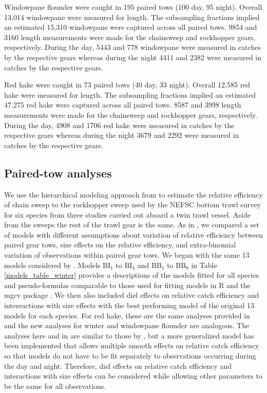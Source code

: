 \documentclass[12pt,letterpaper, leqno]{article}
\begin{document}
Windowpane flounder were caught in 195 paired tows (100 day, 95 night). Overall 13,014 windowpane were measured for length. The subsampling fractions implied an estimated 15,310 windowpane were captured across all paired tows. 9854 and 3160 length measurements were made for the chainsweep and rockhopper gears, respectively.  During the day, 5443 and 778 windowpane were measured in catches by the respective gears whereas during the night 4411 and 2382 were measured in catches by the respective gears.

Red hake were caught in 73 paired tows (40 day, 33 night). Overall 12,585  red hake were measured for length. The subsampling fractions implied an estimated 47,275 red hake were captured across all paired tows. 8587 and 3998 length measurements were made for the chainsweep and rockhopper gears, respectively.  During the day, 4908 and 1706 red hake were measured in catches by the respective gears whereas during the night 3679 and 2292 were measured in catches by the respective gears.

\subsection*{Paired-tow analyses}

We use the hierarchical modeling approach from \citet{miller13} to estimate the relative efficiency of chain sweep to the rockhopper sweep used by the NEFSC bottom trawl survey for six species from three studies carried out aboard a twin trawl vessel. Aside from the sweeps the rest of the trawl gear is the same.  As in \citet{miller13}, we compared a set of models with different assumptions about variation of relative efficiency between paired gear tows, size effects on the relative efficiency, and extra-binomial variation of observations within paired gear tows. We began with the same 13 models considered by \citet{miller13}. Models BI$_1$ to BI$_4$ and BB$_1$ to BB$_8$ in Table \ref{models_table_winter} provides a descriptions of the models fitted for all species and pseudo-formulas comparable to those used for fitting models in R and the mgcv package \citep{R19,wood06}. We then also included diel effects on relative catch efficiency and intereactions with size effects with the best performing model of the original 13 models for each species. For red hake, these are the same analyses provided in \citet{milleretal20} and the new analyses for winter and windowpane flounder are analogous. The analyses here and in \citet{milleretal20} are similar to those by \citet{milleretal17a,milleretal17b,milleretal18}, but a more generalized model has been implemented that allows multiple smooth effects on relative catch efficiency so that models do not have to be fit separately to observations occurring during the day and night. Therefore, diel effects on relative catch efficiency and interactions with size effects can be considered while allowing other parameters to be the same for all observations. 
\end{document}
